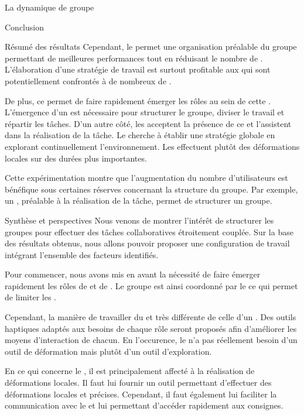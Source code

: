 \documentclass[myfrancais,ngerman,english,french]{mythesis}
\begin{document}
\begin{mychapter}{La dynamique de groupe}
\begin{mysection}{Conclusion}
\begin{mysubsection}{Résumé des résultats}
				Cependant, le \mybrainstorming permet une organisation préalable du groupe permettant de meilleures performances tout en réduisant le nombre de .
				L'élaboration d'une stratégie de travail est surtout profitable aux  qui sont potentiellement confrontés à de nombreux de .

				De plus, ce \mybrainstorming permet de faire rapidement émerger les rôles au sein de cette .
				L'émergence d'un  est nécessaire pour structurer le groupe, diviser le travail et répartir les tâches.
				D'un autre côté, les  acceptent la présence de ce  et l'assistent dans la réalisation de la tâche.
				Le  cherche à établir une stratégie globale en explorant continuellement l'environnement.
				Les  effectuent plutôt des déformations locales sur des durées plus importantes.

				Cette expérimentation montre que l'augmentation du nombre d'utilisateurs est bénéfique sous certaines réserves concernant la structure du groupe.
				Par exemple, un \mybrainstorming, préalable à la réalisation de la tâche, permet de structurer un groupe.
			\end{mysubsection}
			\begin{mysubsection}{Synthèse et perspectives}
				Nous venons de montrer l'intérêt de structurer les groupes pour effectuer des tâches collaboratives étroitement couplée.
				Sur la base des résultats obtenus, nous allons pouvoir proposer une configuration de travail intégrant l'ensemble des facteurs identifiés.

				Pour commencer, nous avons mis en avant la nécessité de faire émerger rapidement les rôles de  et de .
				Le groupe est ainsi coordonné par le  ce qui permet de limiter les .

				Cependant, la manière de travailler du  et très différente de celle d'un .
				Des outils haptiques adaptés aux besoins de chaque rôle seront proposés afin d'améliorer les moyens d'interaction de chacun.
				En l'occurence, le  n'a pas réellement besoin d'un outil de déformation mais plutôt d'un outil d'exploration.

				En ce qui concerne le , il est principalement affecté à la réalisation de déformations locales.
				Il faut lui fournir un outil permettant d'effectuer des déformations locales et précises.
				Cependant, il faut également lui faciliter la communication avec le  et lui permettant d'accéder rapidement aux consignes.


\end{mysubsection}
\end{mysection}
\end{mychapter}
\end{document}
